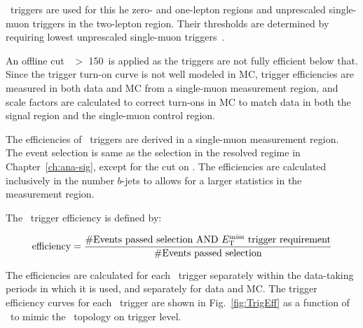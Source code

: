\par \MET~triggers are used for this he zero- and one-lepton regions and unprescaled single-muon triggers in the two-lepton region. 
Their thresholds are determined by requiring lowest unprescaled single-muon triggers~\cite{lowest_unprescaled_triggers}. 

\par An offline cut \MET~$>$ 150~\GeV is applied as the triggers are not fully efficient below that. Since the trigger turn-on curve is not well modeled in MC,
 trigger efficiencies are measured in both data and MC from a single-muon measurement region, and scale factors are calculated to correct
turn-ons in MC to match data in both the signal region and the single-muon control region.

\par The efficiencies of \MET~triggers are derived in a single-muon measurement region.
The event selection is same as the selection in the resolved regime in Chapter~\ref{ch:ana-sig}, except for the cut on \met.
The efficiencies are calculated inclusively in the number $b$-jets to allows for a larger statistics in the measurement region.

\par The \MET~trigger efficiency is defined by:

\begin{equation}
	\label{eq:trigeff}
	\text{efficiency} = \frac{\text{\#Events passed selection AND \ensuremath{E_{\mathrm{T}}^{\mathrm{miss}}}~trigger requirement}}{\text{\#Events passed selection}}
\end{equation}

\par The efficiencies are calculated for each \MET~trigger separately within the data-taking periods in which it is used, and separately for data and MC.
 The trigger efficiency curves for each \MET~trigger are shown in Fig.~\ref{fig:TrigEff} as a function of \METnomu~to mimic the \MET~topology on trigger level.

